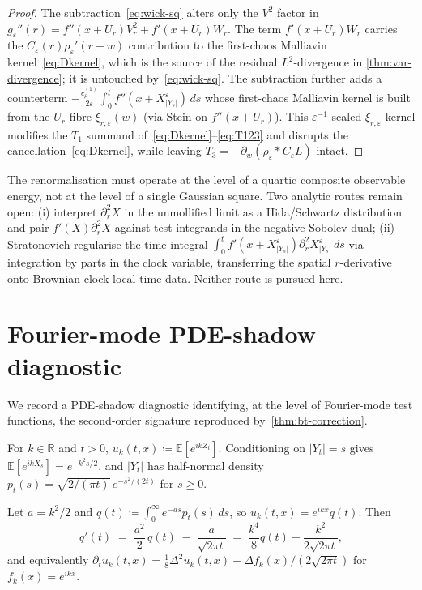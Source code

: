 \documentclass[EJP]{ejpecp}
\newcommand{\R}{\mathbb{R}}
\renewcommand{\E}{\mathbb{E}}
\begin{document}
\begin{proof}
The subtraction~\eqref{eq:wick-sq} alters only the $V^{2}$ factor in
$g_\varepsilon''(r)=f''(x+U_r)V_r^{2}+f'(x+U_r)W_r$. The term
$f'(x+U_r)W_r$ carries the $C_\varepsilon(r)\rho_\varepsilon'(r-w)$
contribution to the first-chaos Malliavin kernel~\eqref{eq:Dkernel},
which is the source of the residual $L^{2}$-divergence in
\cref{thm:var-divergence}; it is untouched by~\eqref{eq:wick-sq}.
The subtraction further adds a counterterm
$-\tfrac{c_\rho^{(1)}}{2\varepsilon}\!\int_0^t f''(x+X^\varepsilon_{|Y_s|})\,ds$
whose first-chaos Malliavin kernel is built from the $U_r$-fibre
$\xi_{r,\varepsilon}(w)$ (via Stein on $f''(x+U_r)$). This
$\varepsilon^{-1}$-scaled $\xi_{r,\varepsilon}$-kernel modifies the
$T_1$ summand of~\eqref{eq:Dkernel}--\eqref{eq:T123} and disrupts
the cancellation~\eqref{eq:Dkernel}, while leaving
$T_3=-\partial_w(\rho_\varepsilon*C_\varepsilon L)$ intact.
\end{proof}

The renormalisation must operate at the level of a quartic composite
observable energy, not at the level of a single Gaussian square.
Two analytic routes remain open: (i) interpret
$\partial_r^{2}X$ in the unmollified limit as a Hida/Schwartz
distribution and pair $f'(X)\partial_r^{2}X$ against test
integrands in the negative-Sobolev dual; (ii) Stratonovich-regularise
the time integral $\int_0^t f'(x+X^\varepsilon_{|Y_s|})\partial_r^{2}X^\varepsilon_{|Y_s|}\,ds$
via integration by parts in the clock variable, transferring the
spatial $r$-derivative onto Brownian-clock local-time data. Neither
route is pursued here.

\section{Fourier-mode PDE-shadow diagnostic}\label{sec:fourier-app}

We record a PDE-shadow diagnostic identifying, at the level of
Fourier-mode test functions, the second-order signature reproduced
by~\cref{thm:bt-correction}.

For $k\in\R$ and $t>0$, $u_k(t,x)\coloneqq\E[e^{ikZ_t}]$.
Conditioning on $|Y_t|=s$ gives $\E[e^{ikX_s}]=e^{-k^{2}s/2}$, and
$|Y_t|$ has half-normal density $p_t(s)=\sqrt{2/(\pi t)}\,e^{-s^{2}/(2t)}$
for $s\ge 0$.

\begin{proposition}
\label{prop:fourier-2nd}
Let $a=k^{2}/2$ and $q(t)\coloneqq\int_0^\infty e^{-as}p_t(s)\,ds$,
so $u_k(t,x)=e^{ikx}q(t)$. Then
\begin{equation}\label{eq:q-ode}
  q'(t)\;=\;\frac{a^{2}}{2}\,q(t)\;-\;\frac{a}{\sqrt{2\pi t}}
  \;=\;\frac{k^{4}}{8}q(t)-\frac{k^{2}}{2\sqrt{2\pi t}},
\end{equation}
and equivalently
$\partial_t u_k(t,x)=\tfrac18\Delta^{2}u_k(t,x)+\Delta f_k(x)/(2\sqrt{2\pi t})$
for $f_k(x)=e^{ikx}$.
\end{proposition}
\end{document}
